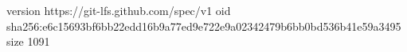 version https://git-lfs.github.com/spec/v1
oid sha256:e6c15693bf6bb22edd16b9a77ed9e722e9a02342479b6bb0bd536b41e59a3495
size 1091
